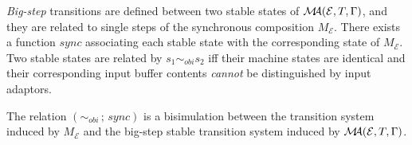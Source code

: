 \emph{Big-step} transitions are defined between two stable states of $\mathcal{M}\!\!\mathcal{A}(\mathcal{E}, T, \Gamma)$,
and they are related to single steps of the synchronous composition $M_{\mathcal{E}}$.
%
There exists a function $\mathit{sync}$ 
associating each stable state with the corresponding state of $M_{\mathcal{E}}$.
%
Two stable states are related by $s_1 \sim_\mathit{obi} s_2$ iff 
their  machine states are identical
and 
their corresponding input buffer contents \emph{cannot} be
distinguished by input adaptors.  

\begin{theorem}\label{thm:mr-pals}   \cite{mr-pals-journal}
The relation $(\sim_\mathit{obi} \,;\, \mathit{sync})$ 
is a bisimulation between 
the transition system induced by $M_{\mathcal{E}}$
and the big-step stable transition system induced by $\mathcal{M}\!\!\mathcal{A}(\mathcal{E}, T, \Gamma)$.
\end{theorem}










